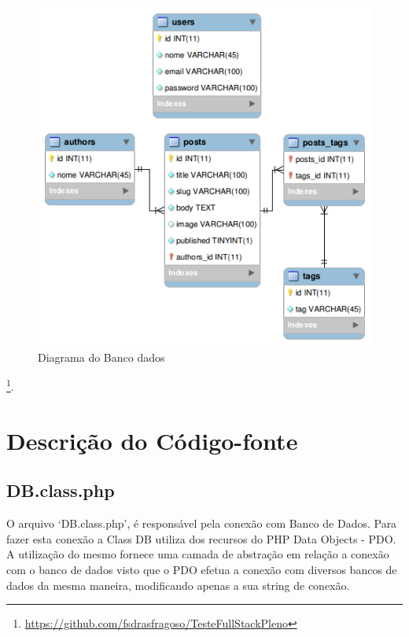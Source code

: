 \documentclass[
	article,			%
	11pt,				%
	oneside,			%
	a4paper,			%
	english,			%
	brazil,				%
	sumario=tradicional
	]{abntex2}
\begin{document}
\begin{figure} [h!]
  \centering
    \caption{Diagrama do Banco dados}
  \label{diagrama}
    \includegraphics[scale=0.5]{diagra.png}
       
\end{figure}


\footnote{\url{https://github.com/fsdrasfragoso/TesteFullStackPleno}}.



\section{Descrição do Código-fonte}

\subsection{DB.class.php}

O arquivo ‘DB.class.php’, é responsável pela conexão com Banco de Dados. Para fazer esta conexão a Class DB utiliza dos recursos do PHP Data Objects - PDO. A utilização do mesmo fornece uma camada de abstração em relação a conexão com o banco de dados visto que o PDO efetua a conexão com diversos bancos de dados da mesma maneira, modificando apenas a sua string de conexão.
\end{document}
